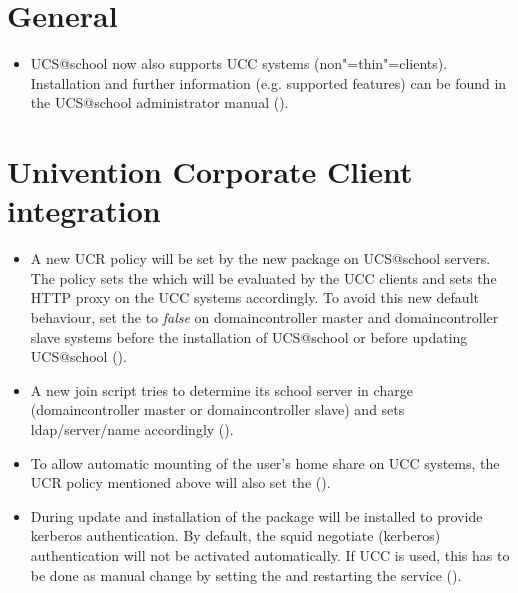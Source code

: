 \section{General}
\begin{itemize}
\item UCS@school now also supports UCC systems (non"=thin"=clients). Installation and further information
  (e.g. supported features) can be found in the UCS@school administrator manual ().
\end{itemize}

\section{Univention Corporate Client integration}
\begin{itemize}
\item A new UCR policy will be set by the new package  on UCS@school
  servers. The policy sets the  which will be evaluated by the UCC clients and sets
  the HTTP proxy on the UCC systems accordingly. To avoid this new default behaviour, set the
   to \emph{false} on domaincontroller master
  and domaincontroller slave systems before the installation of UCS@school or before updating UCS@school
  ().
\item A new join script tries to determine its school server in charge (domaincontroller master or domaincontroller
  slave) and sets ldap/server/name accordingly ().
\item To allow automatic mounting of the user's home share on UCC systems, the UCR policy mentioned above will also set the
   ().
\item During update and installation of \ucsUAS{} the package  will be
  installed to provide kerberos authentication. By default, the squid negotiate (kerberos) authentication will
  not be activated automatically. If UCC is used, this has to be done as manual change by setting the
   and restarting the service  ().
\end{itemize}

 
